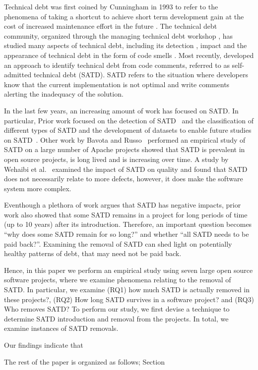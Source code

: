 
Technical debt was first coined by Cunningham in 1993 to refer to the phenomena of taking a shortcut to achieve short term development gain at the cost of increased maintenance effort in the future \cite{Cunningham1992WPM}. The technical debt community, organized through the managing technical debt workshop \cite{MTD2016}, has studied many aspects of technical debt, including its detection \cite{Zazworka2013EASE}, impact \cite{Zazworka2011MTD} and the appearance of technical debt in the form of code smells \cite{Fontana2012MTD}. Most recently,  developed an approach to identify technical debt from code comments, referred to as self-admitted technical debt (SATD). SATD refers to the situation where developers know that the current implementation is not optimal and write comments alerting the inadequacy of the solution. 


In the last few years, an increasing amount of work has focused on SATD. In particular,  Prior work focused on the detection of SATD~\cite{Potdar2014ICSME} and the classification of different types of SATD and the development of datasets to enable future studies on SATD~\cite{Maldonado2015MTD}. Other work by Bavota and Russo~\cite{Bavota2016MSR} performed an empirical study of SATD on a large number of Apache projects showed that SATD is prevalent in open source projects, is long lived and is increasing over time. A study by Wehaibi et al.~\cite{Wehaibi2016SANER} examined the impact of SATD on quality and found that SATD does not necessarily relate to more defects, however, it does make the software system more complex.

Eventhough a plethora of work argues that SATD has negative impacts, prior work also showed that some SATD remains in a project for long periods of time (up to 10 years) after its introduction. Therefore, an important question becomes ``why does some SATD remain for so long?'' and whether ``all SATD needs to be paid back?''. Examining the removal of SATD can shed light on potentially healthy patterns of debt, that may need not be paid back.

Hence, in this paper we perform an empirical study using seven large open source software projects, where we examine phenomena relating to the removal of SATD. In particular, we examine (RQ1) how much SATD is actually removed in these projects?, (RQ2) How long SATD survives in a software project? and (RQ3) Who removes SATD? To perform our study, we first devise a technique to determine SATD introduction and removal from the projects. In total, we examine  instances of SATD removals.

Our findings indicate that 

The rest of the paper is organized as follows; Section 